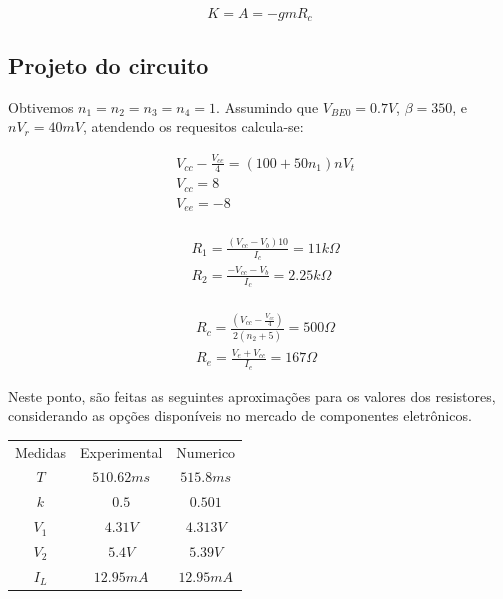 \begin{equation}
    K = A = - gm R_c
\end{equation}


\subsection{Projeto do circuito}

Obtivemos $n_1 = n_2 = n_3 = n_4 = 1$. Assumindo que $V_{BE0} = 0.7 V$, $\beta = 350$, e $n V_r = 40 mV$, atendendo os requesitos calcula-se:

\begin{equation}
    \begin{aligned}
         & V_{cc} - \frac{V_{cc}}{4} = (100 + 50 n_1) n V_t \\
         & V_{cc} = 8                                       \\
         & V_{ee} = -8                                      \\
    \end{aligned}
\end{equation}

\begin{equation}
    \begin{aligned}
         & R_1 = \frac{(V_{cc} - V_b)  10}{I_c} = 11 k \varOmega \\
         & R_2 = \frac{- V_{cc} - V_b}{I_c} = 2.25 k \varOmega   \\
    \end{aligned}
\end{equation}

\begin{equation}
    \begin{aligned}
         & R_c = \frac{\left(V_{cc} - \frac{V_{cc}}{4}\right)}{2 (n_2 +5)} = 500\varOmega \\
         & R_e = \frac{V_e + V_{cc}}{I_e} = 167 \varOmega
    \end{aligned}
\end{equation}

Neste ponto, são feitas as seguintes aproximações para os valores dos resistores, considerando as opções disponíveis no mercado de componentes eletrônicos.

\begin{center}
    \begin{tabular}{ |c|c|c| }
        \hline
        Medidas & Experimental & Numerico   \\
        $T$     & $510.62 ms$  & $515.8 ms$ \\
        $k$     & $0.5$        & $0.501$    \\
        $V_1$   & $4.31V$      & $4.313V$   \\
        $V_2$   & $5.4V$       & $5.39V$    \\
        $I_L$   & $12.95mA$    & $12.95mA$  \\
        \hline
    \end{tabular}
\end{center}